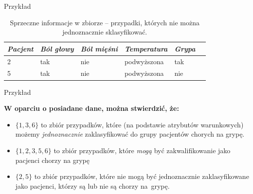 \documentclass[10pt]{beamer}
\begin{document}
\begin{frame}{Przykład}
\renewcommand{\arraystretch}{1}
\begin{center}
\begin{table}
\begin{tabular}{|k{1.2cm}|k{1.8cm}|k{1.8cm}|k{2.2cm}|k{1.4cm}|@{}m{0pt}@{}}
\hline
\textit{Pacjent} & \textit{Ból głowy} & \textit{Ból mięśni} & \textit{Temperatura} &  \textit{Grypa} &\\[1ex]
 & tak & nie & podwyższona & tak &\\[1ex]
5 & tak & nie & podwyższona & nie &\\[1ex]
\hline
\end{tabular}
\caption{Sprzeczne informacje w zbiorze -- przypadki, których nie można jednoznacznie sklasyfikować.}
\end{table}
\end{center}


\end{frame}


\begin{frame}{Przykład}
\begin{spacing}{1.5}
\textbf{W oparciu o posiadane dane, można stwierdzić, że:}\\
\begin{itemize}
\item $\lbrace 1,3,6 \rbrace$ to zbiór przypadków, które (na podstawie atrybutów warunkowych) możemy \textit{jednoznacznie} zaklasyfikować do grupy pacjentów chorych na grypę.
\item $\lbrace 1,2,3,5,6 \rbrace$ to zbiór przypadków, które \textit{mogą} być zakwalifikowanie jako pacjenci chorzy na grypę
\item $\lbrace 2,5 \rbrace$ to zbiór przypadków, które nie mogą być jednoznacznie zaklasyfikowane jako pacjenci, którzy są lub nie są chorzy na~grypę.
\end{itemize}
\end{spacing}
\end{frame}
\end{document}
